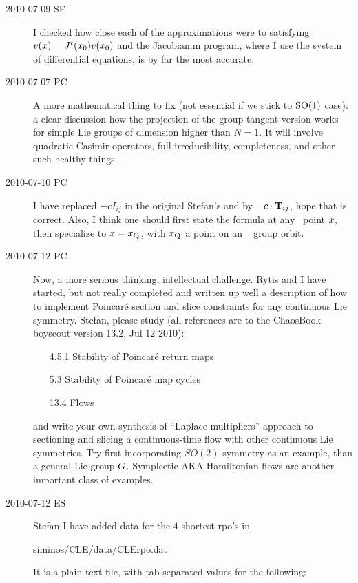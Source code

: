 \begin{description}
\item[2010-07-09 SF]
I checked how close each of the approximations were to satisfying
$v(x)=J^t({x_0}) v({x_0})$ and the Jacobian.m program, where I use the
system of differential equations, is by far the most accurate.

\item[2010-07-07 PC]                                    \toCB
A more mathematical thing to fix (not essential if we stick to $\textrm{SO}(1)$
case): a clear discussion how the projection of the group tangent version
works for simple Lie groups of dimension higher than $N=1$. It will
involve quadratic Casimir operators, full irreducibility, completeness,
and other such healthy things.

\item[2010-07-10 PC] I have replaced $-c I_{ij}$ in
the original Stefan's
 and  by
$-c \cdot \mathbf{T}_{ij}$, hope that is correct. Also,
I think one should first state the formula at any \statesp\
point $x$, then specialize to $x = x_{\mathrm{Q}_{}}$, with
$x_{\mathrm{Q}_{}}$ a point on an \reqv\ \REQB{} group orbit.

\item[2010-07-12 PC] Now, a more serious thinking,
intellectual
challenge. Rytis and I have started, but not really completed
and written up well a description of how to implement Poincar\'e
section and slice constraints for any continuous Lie symmetry.
Stefan, please study (all references are to the ChaosBook
boyscout version 13.2, Jul 12 2010):
\begin{itemize}
  \item[4.5.1] Stability of Poincar\'e return maps
  \item[5.3] Stability of Poincar\'e map cycles
  \item[13.4] Flows
\end{itemize}
and write your own synthesis of ``Laplace multipliers''
approach to sectioning and slicing a continuous-time
flow with other continuous Lie symmetries. Try first
incorporating $SO(2)$ symmetry as an example, than
a general Lie group $G$. Symplectic AKA Hamiltonian
flows are another important class of examples.

\item[2010-07-12 ES]                                \toCB
Stefan I have added data for the $4$ shortest rpo's
in

siminos/CLE/data/CLErpo.dat

It is a plain text file, with tab separated values for the following:


\end{description}
